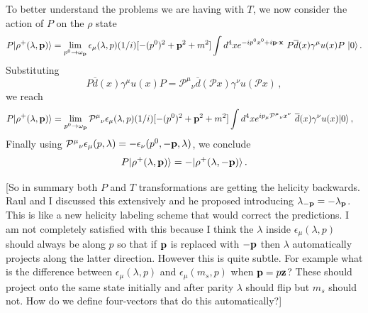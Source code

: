 {\mh To better understand the problems we are having with $T$, we now consider the action of $P$ on the $\rho$ state
\begin{equation}
P \vert \rho^+( \lambda, \textbf p) \rangle =  \lim_{p^0 \to \omega_\textbf p} \epsilon_{\mu}(\lambda, p) (1/i) [- (p^0)^2 + \textbf p^2 + m^2] \int d^4 x e^{ - i p^0  x^0 + i \textbf p \cdot \textbf x} \ P \overline d(x) \gamma^\mu u(x)     P \  \vert 0 \rangle \,.
\end{equation}
Substituting  
\begin{equation}
P \overline d(x) \gamma^\mu u(x)     P =  {\mathcal P^\mu}_\nu \overline d(\mathcal P x) \gamma^\nu u(\mathcal P x)     \,,
\end{equation}
we reach
\begin{align}
P \vert \rho^+( \lambda, \textbf p) \rangle & =     \lim_{p^0 \to \omega_\textbf p}   {\mathcal P^\mu}_\nu   \epsilon_{\mu}( \lambda, p) (1/i) [- (p^0)^2 + \textbf p^2 + m^2] \int d^4 x e^{ i p_\mu {\mathcal P^\mu}_\nu  x^\nu} \   \overline d(x) \gamma^\nu u(x)      \vert 0 \rangle \,, 
\end{align}
Finally using $ {\mathcal P^\mu}_\nu \epsilon_{\mu}(p,  \lambda) = - \epsilon_{\nu}(p^0, - \textbf p,  \lambda)$, we conclude
\begin{equation}
 P \vert \rho^+(\lambda, \textbf p) \rangle = - \vert \rho^+( \lambda ,- \textbf p) \rangle \,.
\end{equation}

[So in summary both $P$ and $T$ transformations are getting the helicity backwards. Raul and I discussed this extensively and he proposed introducing $\lambda_{- \textbf p} = - \lambda_{\textbf p}$. This is like a new helicity labeling scheme that would correct the predictions. I am not completely satisfied with this because I think the $\lambda$ inside $\epsilon_\mu(\lambda,  p)$ should always be along $p$ so that if $\textbf p$ is replaced with $- \textbf p$ then $\lambda$ automatically projects along the latter direction. However this is quite subtle. For example what is the difference between $\epsilon_\mu(\lambda,  p )$ and $\epsilon_\mu(m_s,  p )$ when $\textbf p = p \textbf z$? These should project onto the same state initially and after parity $\lambda$ should flip but $m_s$ should not. How do we define four-vectors that do this automatically?]

}



